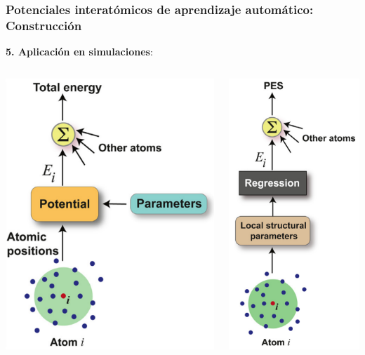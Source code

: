 \documentclass[aspectratio=169]{beamer}
\let\oldtextbf\textbf
\renewcommand{\textbf}[1]{\textcolor{nordblue}{\oldtextbf{#1}}}
\begin{document}
    \begin{frame}
        \frametitle{Potenciales interatómicos de aprendizaje automático: Construcción}
        
        \textbf{5. Aplicación en simulaciones}:

        \begin{columns}
            \begin{center}
                \includegraphics[width=0.5\columnwidth]{intro-ff.png}
            \end{center}
            \begin{center}
                \includegraphics[width=0.3\columnwidth]{intro-ml.png}
            \end{center}
        \end{columns}

	\end{frame}
\end{document}
